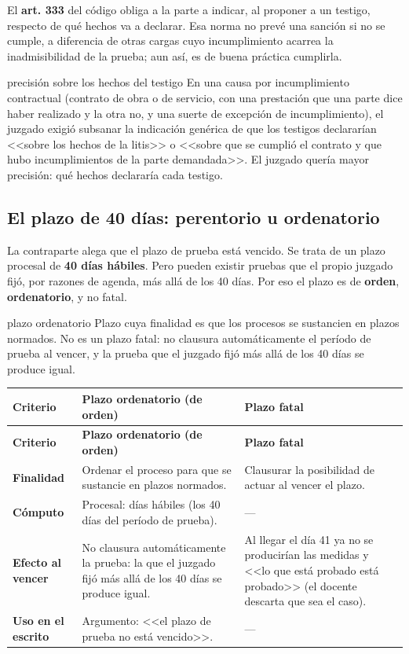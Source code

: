 \documentclass[12pt,oneside]{book}
\begin{document}
El \textbf{art. 333} del código obliga a la parte a indicar, al proponer a un testigo, respecto de qué hechos va a declarar. Esa norma no prevé una sanción si no se cumple, a diferencia de otras cargas cuyo incumplimiento acarrea la inadmisibilidad de la prueba; aun así, es de buena práctica cumplirla.

\begin{example}{precisión sobre los hechos del testigo}
En una causa por incumplimiento contractual (contrato de obra o de servicio, con una prestación que una parte dice haber realizado y la otra no, y una suerte de excepción de incumplimiento), el juzgado exigió subsanar la indicación genérica de que los testigos declararían <<sobre los hechos de la litis>> o <<sobre que se cumplió el contrato y que hubo incumplimientos de la parte demandada>>. El juzgado quería mayor precisión: qué hechos declararía cada testigo.
\end{example}

\subsection{El plazo de 40 días: perentorio u ordenatorio}

La contraparte alega que el plazo de prueba está vencido. Se trata de un plazo procesal de \textbf{40 días hábiles}. Pero pueden existir pruebas que el propio juzgado fijó, por razones de agenda, más allá de los 40 días. Por eso el plazo es de \textbf{orden}, \textbf{ordenatorio}, y no fatal.

\begin{definition}{plazo ordenatorio}
Plazo cuya finalidad es que los procesos se sustancien en plazos normados. No es un plazo fatal: no clausura automáticamente el período de prueba al vencer, y la prueba que el juzgado fijó más allá de los 40 días se produce igual.
\end{definition}

\begin{longtable}{@{}L{0.17\textwidth}L{0.36\textwidth}L{0.37\textwidth}@{}}
\toprule
\textbf{Criterio} & \textbf{Plazo ordenatorio (de orden)} & \textbf{Plazo fatal} \\
\midrule
\endfirsthead
\toprule
\textbf{Criterio} & \textbf{Plazo ordenatorio (de orden)} & \textbf{Plazo fatal} \\
\midrule
\endhead
\bottomrule
\endlastfoot
\textbf{Finalidad} & Ordenar el proceso para que se sustancie en plazos normados. & Clausurar la posibilidad de actuar al vencer el plazo. \\
\textbf{Cómputo} & Procesal: días hábiles (los 40 días del período de prueba). & --- \\
\textbf{Efecto al vencer} & No clausura automáticamente la prueba: la que el juzgado fijó más allá de los 40 días se produce igual. & Al llegar el día 41 ya no se producirían las medidas y <<lo que está probado está probado>> (el docente descarta que sea el caso). \\
\textbf{Uso en el escrito} & Argumento: <<el plazo de prueba no está vencido>>. & --- \\
\end{longtable}
\end{document}
